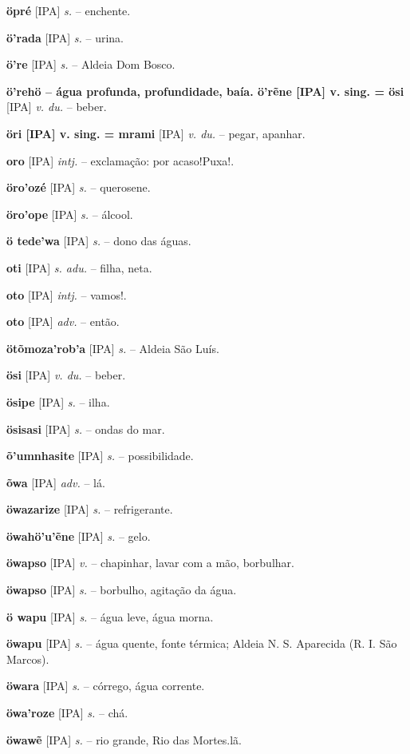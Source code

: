 \textbf{öpré} [IPA] \textit{s.} -- enchente.

\textbf{ö'rada} [IPA] \textit{s.} -- urina.

\textbf{ö're} [IPA] \textit{s.} -- Aldeia Dom Bosco.

\textbf{ö'rehö -- água profunda, profundidade, baía. ö'rẽne [IPA] v. sing. = ösi} [IPA] \textit{v. du.} -- beber.

\textbf{öri [IPA] v. sing. = mrami} [IPA] \textit{v. du.} -- pegar, apanhar.

\textbf{oro} [IPA] \textit{intj.} -- exclamação: por acaso!Puxa!.

\textbf{öro'ozé} [IPA] \textit{s.} -- querosene.

\textbf{öro'ope} [IPA] \textit{s.} -- álcool.

\textbf{ö tede'wa} [IPA] \textit{s.} -- dono das águas.

\textbf{oti} [IPA] \textit{s. adu.} -- filha, neta.

\textbf{oto} [IPA] \textit{intj.} -- vamos!.

\textbf{oto} [IPA] \textit{adv.} -- então.

\textbf{ötõmoza'rob'a} [IPA] \textit{s.} -- Aldeia São Luís.

\textbf{ösi} [IPA] \textit{v. du.} -- beber.

\textbf{ösipe} [IPA] \textit{s.} -- ilha.

\textbf{ösisasi} [IPA] \textit{s.} -- ondas do mar.

\textbf{õ'umnhasite} [IPA] \textit{s.} -- possibilidade.

\textbf{õwa} [IPA] \textit{adv.} -- lá.

\textbf{öwazarize} [IPA] \textit{s.} -- refrigerante.

\textbf{öwahö'u'ẽne} [IPA] \textit{s.} -- gelo.

\textbf{öwapso} [IPA] \textit{v.} -- chapinhar, lavar com a mão, borbulhar.

\textbf{öwapso} [IPA] \textit{s.} -- borbulho, agitação da água.

\textbf{ö wapu} [IPA] \textit{s.} -- água leve, água morna.

\textbf{öwapu} [IPA] \textit{s.} -- água quente, fonte térmica; Aldeia N. S. Aparecida (R. I. São Marcos).

\textbf{öwara} [IPA] \textit{s.} -- córrego, água corrente.

\textbf{öwa'roze} [IPA] \textit{s.} -- chá.

\textbf{öwawẽ} [IPA] \textit{s.} -- rio grande, Rio das Mortes.lã.

